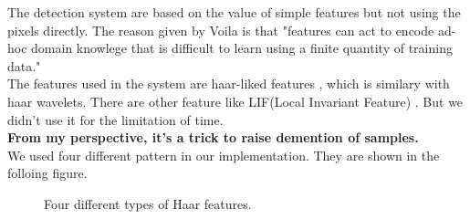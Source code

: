 \documentclass[a4paper, 11pt]{article} %
\begin{document}
    The detection system are based on the value of simple features but not using the pixels directly. The reason given by Voila is that "features can act to encode ad-hoc domain knowlege that is difficult to learn using a finite quantity of training data."\\

    The features used in the system are haar-liked features \cite{RobustRealTimeFaceDetection}, which is similary with haar wavelets. There are other feature like LIF(Local Invariant Feature) \cite{LocalInvariantFeatureDetectors} . But we didn't use it for the limitation of time.\\

\textbf{From my perspective, it's a trick to raise demention of samples.}\\


    We used four different pattern in our implementation. They are shown in the folloing figure.

    \begin{figure}[H]
        \centering
        \label{fig:differentHaarFeature}
        \caption{Four different types of Haar features.}
    \end{figure}
\end{document}
